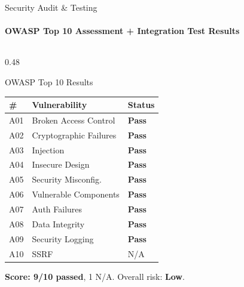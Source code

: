 \documentclass[aspectratio=169,11pt]{beamer}
\begin{document}
\begin{frame}[shrink=15]{Security Audit \& Testing}
\framesubtitle{OWASP Top 10 Assessment + Integration Test Results}

\vspace{-0.6em}
\begin{columns}[T]
\begin{column}{0.48\textwidth}
\begin{block}{OWASP Top 10 Results}
{\small
\begin{center}
\begin{tabular}{lll}
\toprule
\textbf{\#} & \textbf{Vulnerability} & \textbf{Status} \\
\midrule
A01 & Broken Access Control & \textcolor{UNBGreen}{\textbf{Pass}} \\
A02 & Cryptographic Failures & \textcolor{UNBGreen}{\textbf{Pass}} \\
A03 & Injection & \textcolor{UNBGreen}{\textbf{Pass}} \\
A04 & Insecure Design & \textcolor{UNBGreen}{\textbf{Pass}} \\
A05 & Security Misconfig. & \textcolor{UNBGreen}{\textbf{Pass}} \\
A06 & Vulnerable Components & \textcolor{UNBGreen}{\textbf{Pass}} \\
A07 & Auth Failures & \textcolor{UNBGreen}{\textbf{Pass}} \\
A08 & Data Integrity & \textcolor{UNBGreen}{\textbf{Pass}} \\
A09 & Security Logging & \textcolor{UNBGreen}{\textbf{Pass}} \\
A10 & SSRF & N/A \\
\bottomrule
\end{tabular}
\end{center}
}
\end{block}
\vspace{0.2em}
{\small \textbf{Score: 9/10 passed}, 1 N/A. Overall risk: \textcolor{UNBGreen}{\textbf{Low}}.}
\end{column}


\end{columns}
\end{frame}
\end{document}

